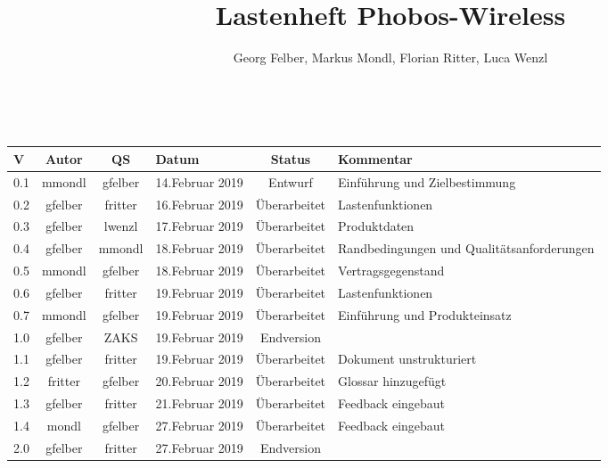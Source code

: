 \documentclass[11pt,a4paper]{article}
\author{Georg Felber, Markus Mondl, Florian Ritter, Luca Wenzl}
\title{Lastenheft Phobos-Wireless}
\begin{document}
	\maketitle
	\mbox{}\\
	\begin{table}[H]
		\begin{center}
			\begin{tabularx} {\linewidth}{|l|c|c|l|c|X|}
				\hline
				\textbf{V} & 
				\textbf{Autor} &
				\textbf{QS} & 
				\textbf{Datum} & 
				\textbf{Status} & 
				\textbf{Kommentar} \\
				\hline
				0.1 & mmondl & gfelber & 14.Februar 2019 & Entwurf & Einführung und Zielbestimmung\\
				\hline
				0.2 & gfelber & fritter & 16.Februar 2019 & Überarbeitet & Lastenfunktionen\\
				\hline
				0.3 & gfelber & lwenzl & 17.Februar 2019 & Überarbeitet & Produktdaten\\
				\hline
				0.4 & gfelber & mmondl & 18.Februar 2019 & Überarbeitet & Randbedingungen und Qualitätsanforderungen\\
				\hline
				0.5 & mmondl & gfelber & 18.Februar 2019 & Überarbeitet & Vertragsgegenstand\\
				\hline
				0.6 & gfelber & fritter & 19.Februar 2019 & Überarbeitet & Lastenfunktionen\\
				\hline
				0.7 & mmondl & gfelber & 19.Februar 2019 & Überarbeitet & Einführung und Produkteinsatz\\
				\hline
				1.0 & gfelber & ZAKS & 19.Februar 2019 & Endversion &\\
				\hline
				1.1 & gfelber & fritter & 19.Februar 2019 & Überarbeitet & Dokument unstrukturiert\\
				\hline
				1.2 & fritter & gfelber & 20.Februar 2019 & Überarbeitet & Glossar hinzugefügt\\
				\hline
				1.3 & gfelber & fritter & 21.Februar 2019 & Überarbeitet & Feedback eingebaut\\
				\hline
				1.4 & mondl & gfelber & 27.Februar 2019 & Überarbeitet & Feedback eingebaut\\
				\hline
				2.0 & gfelber & fritter & 27.Februar 2019 & Endversion &\\
				\hline
			\end{tabularx}
		\end{center}
	\end{table}
	\newpage
	\tableofcontents
	\newpage
	\newpage
	
\end{document}
